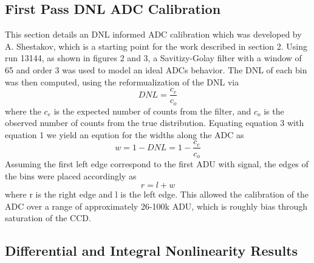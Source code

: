 \documentclass[11pt, letterpaper]{article}
\begin{document}
\subsection{First Pass DNL ADC Calibration}
\indent


This section details an DNL informed ADC calibration which was developed by A. Shestakov, which is a starting point for the work described in section 2. 
Using run 13144, as shown in figures 2 and 3, a Savitizy-Golay filter with a window of 65 and order 3 was used to model an ideal ADCs behavior. 
The DNL of each bin was then computed, using the reformualization of the DNL via 
 \begin{equation}\label{}
 DNL = \frac{c_e}{c_o}
 \end{equation}
where the $c_{e}$ is the expected number of counts from the filter, and $c_{o}$ is the observed number of counts from the true distribution. 
Equating equation 3 with equation 1 we yield an eqution for the widths along the ADC as
 \begin{equation}\label{}
 w = 1-DNL = 1- \frac{c_e}{c_o}
 \end{equation}
Assuming the first left edge correspond to the first ADU with signal, the edges of the bins were placed accordingly as
 \begin{equation}\label{}
r = l + w 
\end{equation}
where r is the right edge and l is the left edge. 
This allowed the calibration of the ADC over a range of approximately 26-100k ADU, which is roughly bias through saturation of the CCD.  


\subsection{Differential and Integral Nonlinearity Results}
\indent
\end{document}
